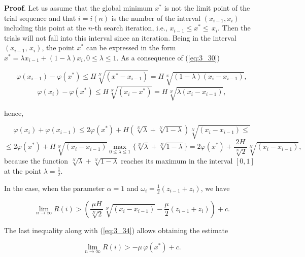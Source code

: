 	\textbf{Proof}. Let us assume that the global minimum $x^{*} $ is not the limit point of the trial sequence and that $i=i(n)$ is the number of the interval $(x_{i-1} , x_i)$ including this point at the $n$-th search iteration, i.e., $x_{i-1} \le x^{*} \le \, x_i $. Then the trials will not fall into this interval since an iteration. Being in the interval $(x_{i-1} ,\, x_i )$, the point $x^{*} $ can be expressed in the form $x^{*} =\lambda x_{i-1} +(1-\lambda )x_i , 0\le \lambda \le 1$. As a consequence of  (\ref{eq:3_30}) 
	
	\begin{equation*}
	\varphi (x_{i-1} )-\varphi (x^{*} )\le H\sqrt[{N}]{(x^{*} -x_{i-1} )} =H\sqrt[{N}]{(1-\lambda )(x_{i} -x_{i-1} )} ,
	\end{equation*}
	\begin{equation}
	\label{eq:3_33}
	\varphi (x_{i} )-\varphi (x^{*} )\le H\sqrt[{N}]{(x_{i} -x^{*} )} =H\sqrt[{N}]{\lambda (x_{i} -x_{i-1} )} ,
	\end{equation}
	
	hence, 
	
	\begin{equation*}
	\varphi (x_i)+\varphi (x_{i-1} )\le 2\varphi (x^{*} )+H(\sqrt[{N}]{\lambda } +\sqrt[{N}]{1-\lambda } )\sqrt[{N}]{(x_{i} -x_{i-1} )\le } 
	\end{equation*}
	\begin{equation}
	\label{eq:3_34}
	\le 2\varphi (x^{*} )+H\sqrt[{N}]{(x_i -x_{i-1} )} \mathop{\max }\limits_{0\le \lambda \le 1} \{ \sqrt[{N}]{\lambda } +\sqrt[{N}]{1-\lambda } \} =2\varphi (x^{*} )+\frac{2H}{\sqrt[{N}]{2} } \sqrt[{N}]{(x_{i} -x_{i-1} )} ,
	\end{equation}
	because the function $\sqrt[{N}]{\lambda } +\sqrt[{N}]{1-\lambda } $ reaches its maximum in the interval $[0,1]$ at the point $\lambda =\frac{1}{2} $.
	
	In the case, when the parameter $\alpha =1$ and $\omega _i =\frac{1}{2} (z_{i-1} +z_i )$, we have
	
	\begin{equation}
	\label{eq:3_35}
	\mathop{\lim }\limits_{n\to \infty } R(i)>(\frac{\mu H}{\sqrt[{N}]{2} } \sqrt[{N}]{(x_i -x_{i-1} )} -\frac{\mu }{2} (z_{i-1} +z_i))+c.
	\end{equation}
	
	The last inequality along with  (\ref{eq:3_34}) allows obtaining the estimate 
	
	\begin{equation}
	\label{eq:3_36}
	\mathop{\lim }\limits_{n\to \infty } R(i)>-\mu \, \varphi (x^{*} )+c.
	\end{equation}
	
